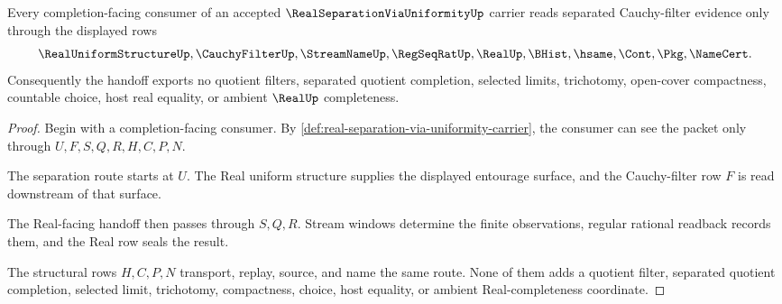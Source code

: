 \begin{theorem}
\label{thm:real-separation-via-uniformity-cauchy-filter-handoff}
Every completion-facing consumer of an accepted $\RealSeparationViaUniformityUp$ carrier reads separated Cauchy-filter evidence only through the displayed rows
$$
\RealUniformStructureUp,\CauchyFilterUp,\StreamNameUp,\RegSeqRatUp,\RealUp,\BHist,\hsame,\Cont,\Pkg,\NameCert .
$$
Consequently the handoff exports no quotient filters, separated quotient completion, selected limits, trichotomy, open-cover compactness, countable choice, host real equality, or ambient $\RealUp$ completeness.
\end{theorem}
\begin{proof}
Begin with a completion-facing consumer. By \autoref{def:real-separation-via-uniformity-carrier}, the consumer can see the packet only through $U,F,S,Q,R,H,C,P,N$.

The separation route starts at $U$. The Real uniform structure supplies the displayed entourage surface, and the Cauchy-filter row $F$ is read downstream of that surface.

The Real-facing handoff then passes through $S,Q,R$. Stream windows determine the finite observations, regular rational readback records them, and the Real row seals the result.

The structural rows $H,C,P,N$ transport, replay, source, and name the same route. None of them adds a quotient filter, separated quotient completion, selected limit, trichotomy, compactness, choice, host equality, or ambient Real-completeness coordinate.
\end{proof}


\begin{closurestatus}{\RealSeparationViaUniformityUp}
  \theoryclosure{\seedClosure}
  \formalstatus{\unformalizedV}
\end{closurestatus}
